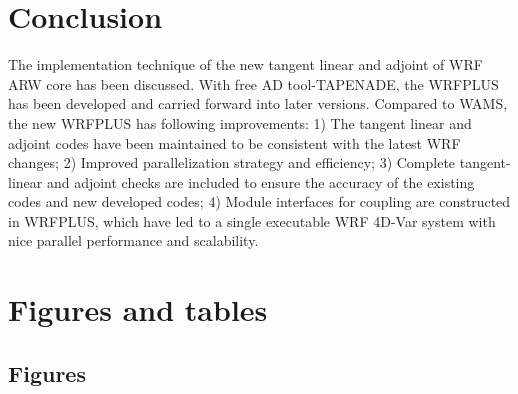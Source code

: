 \documentclass[12pt]{article}
\begin{document}
\section{Conclusion}

The implementation technique of the new tangent linear and adjoint of WRF ARW core has been discussed. With free AD tool-TAPENADE, the WRFPLUS has been developed and carried forward into later versions. Compared to WAMS, the new WRFPLUS has following improvements: 1) The tangent linear and adjoint codes have been maintained to be consistent with the latest WRF changes; 2) Improved parallelization strategy and efficiency; 3) Complete tangent-linear and adjoint checks are included to ensure the accuracy of the existing codes and new developed codes; 4) Module interfaces for coupling are constructed in WRFPLUS, which have led to a single executable WRF 4D-Var system with nice parallel performance and scalability.  


\section{Figures and tables}

\subsection{Figures}
\end{document}
